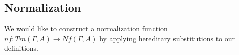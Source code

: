 \subsection{Normalization}

We would like to construct a normalization function $nf : Tm(\Gamma,A) \to Nf(\Gamma,A)$ by applying hereditary substitutions to our definitions.

\begin{code}[hide]%
\>[0]\AgdaOperator{\AgdaFunction{\AgdaUnderscore{}-\AgdaUnderscore{}}}\AgdaSpace{}%
\AgdaSymbol{:}\AgdaSpace{}%
\AgdaSymbol{(}\AgdaSpace{}%
\AgdaSymbol{:}\AgdaSpace{}%
\AgdaSymbol{)}\AgdaSpace{}%
\AgdaSpace{}%
\AgdaSpace{}%
\AgdaSpace{}%
\AgdaSpace{}%
\AgdaSpace{}%
\<%
\\
\>[0]\AgdaSpace{}%
\AgdaOperator{\AgdaFunction{-}}\AgdaSpace{}%
\AgdaSymbol{()}\<%
\\
\>[0]\AgdaSymbol{(}\AgdaSpace{}%
\AgdaSpace{}%
\AgdaSymbol{)}\AgdaSpace{}%
\AgdaOperator{\AgdaFunction{-}}\AgdaSpace{}%
\AgdaSpace{}%
\AgdaSymbol{=}\AgdaSpace{}%
\<%
\\
\>[0]\AgdaSymbol{(}\AgdaSpace{}%
\AgdaSpace{}%
\AgdaSymbol{)}\AgdaSpace{}%
\AgdaOperator{\AgdaFunction{-}}\AgdaSpace{}%
\AgdaSymbol{(}\AgdaSpace{}%
\AgdaSymbol{)}\AgdaSpace{}%
\AgdaSymbol{=}\AgdaSpace{}%
\AgdaSymbol{(}\AgdaSpace{}%
\AgdaOperator{\AgdaFunction{-}}\AgdaSpace{}%
\AgdaSymbol{)}\AgdaSpace{}%
\AgdaSpace{}%
\<%
\\
%
\\[\AgdaEmptyExtraSkip]%
\>[0]\AgdaSpace{}%
\AgdaSymbol{:}\AgdaSpace{}%
\AgdaSymbol{(}\AgdaSpace{}%
\AgdaSymbol{:}\AgdaSpace{}%
\AgdaSpace{}%
\AgdaSpace{}%
\AgdaSymbol{)}\AgdaSpace{}%
\AgdaSpace{}%
\AgdaSpace{}%
\AgdaSymbol{(}\AgdaSpace{}%
\AgdaOperator{\AgdaFunction{-}}\AgdaSpace{}%
\AgdaSymbol{)}\AgdaSpace{}%
\AgdaSpace{}%
\AgdaSpace{}%
\AgdaSpace{}%
\AgdaSpace{}%
\<%

\end{code}
